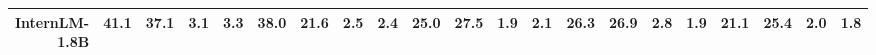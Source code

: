 \begin{table}[t]
{\begin{tabular}{rrrrr|rrrr|rrrr|rrrr|rrrr}
InternLM-1.8B & \cellcolor[HTML]{EFEFCC}41.1 & \cellcolor[HTML]{F6F0CC}37.1 & \cellcolor[HTML]{F8CCCC}3.1 & \cellcolor[HTML]{F8CCCC}3.3 & \cellcolor[HTML]{F2EFCC}38.0 & \cellcolor[HTML]{FDE6CC}21.6 & \cellcolor[HTML]{F8CCCC}2.5 & \cellcolor[HTML]{F8CCCC}2.4 & \cellcolor[HTML]{FFF2CC}25.0 & \cellcolor[HTML]{FAF1CC}27.5 & \cellcolor[HTML]{F8CECC}1.9 & \cellcolor[HTML]{F8CFCC}2.1 & \cellcolor[HTML]{FCF2CC}26.3 & \cellcolor[HTML]{FBF1CC}26.9 & \cellcolor[HTML]{F8CFCC}2.8 & \cellcolor[HTML]{F8CDCC}1.9 & \cellcolor[HTML]{FEECCC}21.1 & \cellcolor[HTML]{FFF2CC}25.4 & \cellcolor[HTML]{F8CECC}2.0 & \cellcolor[HTML]{F8CECC}1.8 \\
\bottomrule
\end{tabular}%
}
\end{table}
